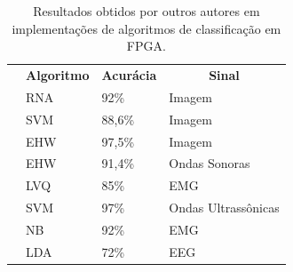\begin{table}[h!]
	\centering
	\caption{Resultados obtidos por outros autores em implementações de algoritmos de classificação em FPGA.}
	\label{estado_da_arte}
	\begin{tabular}{llll}
		\rowcolor[HTML]{ECF4FF} 
		\multicolumn{1}{c}{\cellcolor[HTML]{ECF4FF}\textbf{Autores}} & \multicolumn{1}{c}{\cellcolor[HTML]{ECF4FF}\textbf{Algoritmo}} & \multicolumn{1}{c}{\cellcolor[HTML]{ECF4FF}\textbf{Acurácia}} & \multicolumn{1}{c}{\cellcolor[HTML]{ECF4FF}\textbf{Sinal}} \\
		\textit{\cite{RNAFPGA}}                                     & RNA                                                            & 92\%                                                          & Imagem                                                     \\
		\rowcolor[HTML]{ECF4FF} 
		\textit{\cite{Irick}}                                       & SVM                                                            & 88,6\%                                                        & Imagem                                                     \\
		\textit{\cite{Glette2009}}                                  & EHW                                                            & 97,5\%                                                        & Imagem                                                     \\
		\rowcolor[HTML]{ECF4FF} 
		\textit{\cite{Glette2007}}                                  & EHW                                                            & 91,4\%                                                        & Ondas Sonoras                                              \\
		\textit{\cite{Alkim}}                                       & LVQ                                                            & 85\%                                                          & EMG                                                        \\
		\rowcolor[HTML]{ECF4FF} 
		\textit{\cite{Yuan}}                                        & SVM                                                            & 97\%                                                          & Ondas Ultrassônicas                                        \\
		\textit{\cite{Chen}}                                        & NB                                                             & 92\%                                                          & EMG                                                        \\
		\rowcolor[HTML]{ECF4FF} 
		\textit{\cite{Kais}}                                        & LDA                                                            & 72\%                                                          & EEG                                                       
	\end{tabular}
\end{table}

